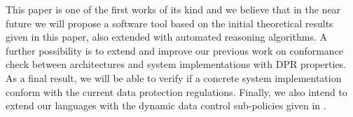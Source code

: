 \documentclass[a4paper]{article}
\begin{document}
This paper is one of the first works of its kind and we believe that in the near future we will propose a software tool based on the initial  theoretical results given in this paper, also extended with automated reasoning algorithms. A further possibility is to extend and improve our previous work on conformance check between architectures and system implementations \cite{TaAntignac14} with DPR properties. As a final result, we will be able to verify if a concrete system implementation conform with the current data protection regulations. Finally, we also intend to extend our languages with the dynamic data control sub-policies given in \cite{TaArxiv15}.    
  
 


 
\end{document}

